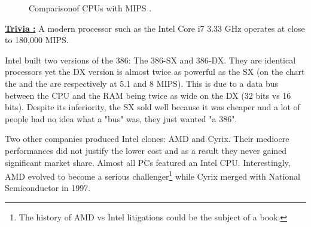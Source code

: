 \documentclass[book.tex]{subfiles}
\begin{document}
\begin{figure}[H]
\centering
   \caption{Comparison\protect\footnotemark of CPUs with MIPS \protect\footnotemark.}
 \end{figure}
 \par
  \textbf{\underline{Trivia :}} A modern processor such as the Intel Core i7 3.33 GHz operates at close to 180,000 MIPS.\\
  \par
 Intel built two versions of the 386: The 386-SX and 386-DX. They are identical processors yet the DX version is almost twice as powerful as the SX (on the chart the  and the  are respectively at 5.1 and 8 MIPS). This is due to a data bus between the CPU and the RAM being twice as wide on the DX (32 bits vs 16 bits). Despite its inferiority, the SX sold well because it was cheaper and a lot of people had no idea what a "bus" was, they just wanted "a 386".\\
 \par
Two other companies produced Intel clones: AMD and Cyrix. Their mediocre performances did not justify the lower cost and as a result they never gained significant market share. Almost all PCs featured an Intel CPU. Interestingly, AMD evolved to become a serious challenger\footnote{The history of AMD vs Intel litigations could be the subject of a book.} while Cyrix merged with National Semiconductor in 1997.\\
\par
\end{document}
